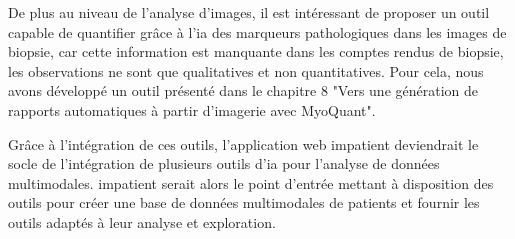 De plus au niveau de l'analyse d'images, il est intéressant de proposer un outil capable de quantifier grâce à l'\gls{ia} des marqueurs pathologiques dans les images de biopsie, car cette information est manquante dans les comptes rendus de biopsie, les observations ne sont que qualitatives et non quantitatives. Pour cela, nous avons développé un outil présenté dans le chapitre 8 "Vers une génération de rapports automatiques à partir d’imagerie avec MyoQuant".


Grâce à l'intégration de ces outils, l'application web \gls{impatient} deviendrait le socle de l'intégration de plusieurs outils d'\gls{ia} pour l'analyse de données multimodales. \gls{impatient} serait alors le point d'entrée mettant à disposition des outils pour créer une base de données multimodales de patients et fournir les outils adaptés à leur analyse et exploration.